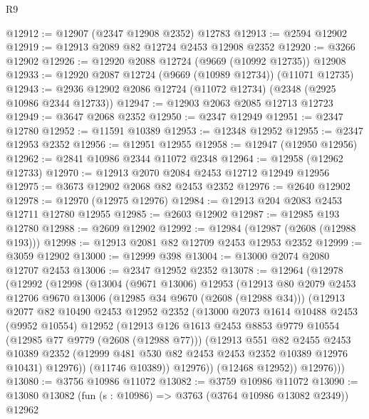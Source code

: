 \begin{lexlean}{R9}
\begin{coremodule}
@12912 := @12907 (@2347 @12908 @2352) @12783
@12913 := @2594 @12902
@12919 := @12913 @2089 @82 @12724 @2453 @12908 @2352
@12920 := @3266 @12902
@12926 := @12920 @2088 @12724 (@9669 (@10992 @12735)) @12908
@12933 := @12920 @2087 @12724 (@9669 (@10989 @12734)) (@11071 @12735)
@12943 := @2936 @12902 @2086 @12724 (@11072 @12734) (@2348 (@2925 @10986 @2344 @12733))
@12947 := @12903 @2063 @2085 @12713 @12723
@12949 := @3647 @2068 @2352
@12950 := @2347 @12949
@12951 := @2347 @12780
@12952 := @11591 @10389
@12953 := @12348 @12952
@12955 := @2347 @12953 @2352
@12956 := @12951 @12955
@12958 := @12947 (@12950 @12956)
@12962 := @2841 @10986 @2344 @11072 @2348
@12964 := @12958 (@12962 @12733)
@12970 := @12913 @2070 @2084 @2453 @12712 @12949 @12956
@12975 := @3673 @12902 @2068 @82 @2453 @2352
@12976 := @2640 @12902
@12978 := @12970 (@12975 @12976)
@12984 := @12913 @204 @2083 @2453 @12711 @12780 @12955
@12985 := @2603 @12902
@12987 := @12985 @193 @12780
@12988 := @2609 @12902
@12992 := @12984 (@12987 (@2608 (@12988 @193)))
@12998 := @12913 @2081 @82 @12709 @2453 @12953 @2352
@12999 := @3059 @12902
@13000 := @12999 @398
@13004 := @13000 @2074 @2080 @12707 @2453
@13006 := @2347 @12952 @2352
@13078 := @12964
    (@12978
      (@12992
        (@12998
          (@13004
            (@9671 @13006)
            @12953
            (@12913
              @80
              @2079
              @2453
              @12706
              @9670
              @13006
              (@12985 @34 @9670 (@2608 (@12988 @34)))
              (@12913
                @2077
                @82
                @10490
                @2453
                @12952
                @2352
                (@13000
                  @2073
                  @1614
                  @10488
                  @2453
                  (@9952 @10554)
                  @12952
                  (@12913
                    @126
                    @1613
                    @2453
                    @8853
                    @9779
                    @10554
                    (@12985 @77 @9779 (@2608 (@12988 @77)))
                    (@12913
                      @551
                      @82
                      @2455
                      @2453
                      @10389
                      @2352
                      (@12999 @481 @530 @82 @2453 @2453 @2352 @10389 @12976 @10431)
                      @12976))
                  (@11746 @10389))
                @12976))
            (@12468 @12952))
          @12976)))
@13080 := @3756 @10986 @11072
@13082 := @3759 @10986 @11072
@13090 := @13080 @13082 (fun (s : @10986) => @3763 (@3764 @10986 @13082 @2349)) @12962

\end{coremodule}
\end{lexlean}
